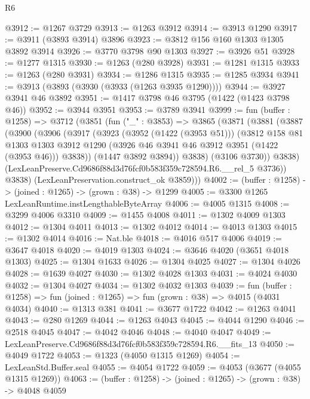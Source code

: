 \begin{lexlean}{R6}
\begin{coremodule}
@3912 := @1267 @3729
@3913 := @1263 @3912
@3914 := @3913 @1290
@3917 := @3911 (@3893 @3914) @3896
@3923 := @3812 @156 @160 @1303 @1305 @3892 @3914
@3926 := @3770 @3798 @90 @1303
@3927 := @3926 @51
@3928 := @1277 @1315
@3930 := @1263 (@280 @3928)
@3931 := @1281 @1315
@3933 := @1263 (@280 @3931)
@3934 := @1286 @1315
@3935 := @1285 @3934
@3941 := @3913 (@3893 (@3930 (@3933 (@1263 @3935 @1290))))
@3944 := @3927 @3941 @46 @3892
@3951 := @1417 @3798 @46 @3795 (@1422 (@1423 @3798 @46))
@3952 := @3944 @3951
@3953 := @3789 @3941
@3999 := fun (buffer : @1258) =>
  @3712
    (@3851
      (fun ("_" : @3853) =>
      @3865
        (@3871
          (@3881
            (@3887
              (@3900
                (@3906
                  (@3917
                    (@3923
                      (@3952 (@1422 (@3953 @51)))
                      (@3812
                        @158
                        @81
                        @1303
                        @1303
                        @3912
                        @1290
                        (@3926 @46 @3941 @46 @3912 @3951 (@1422 (@3953 @46)))
                        @3838))
                    (@1447 @3892 @3894))
                  @3838)
                (@3106 @3730))
              @3838)
            (LexLeanPreserve.Cd9686f88d3d76fcf0b583f359c728594.R6.__rel_5 @3736))
          @3838)
        (LexLeanPreservation.construct_ok @3859)))
@4002 := (buffer : @1258) -> (joined : @1265) -> (grown : @38) -> @1299
@4005 := @3300 @1265 LexLeanRuntime.instLengthableByteArray
@4006 := @4005 @1315
@4008 := @3299 @4006 @3310
@4009 := @1455 @4008
@4011 := @1302 @4009 @1303
@4012 := @1304 @4011
@4013 := @1302 @4012
@4014 := @4013 @1303
@4015 := @1302 @4014
@4016 := Nat.ble
@4018 := @4016 @517 @4006
@4019 := @3647 @4018
@4020 := @4019 @1303
@4024 := @3646 @4020 (@3651 @4018 @1303)
@4025 := @1304 @1633
@4026 := @1304 @4025
@4027 := @1304 @4026
@4028 := @1639 @4027
@4030 := @1302 @4028 @1303
@4031 := @4024 @4030
@4032 := @1304 @4027
@4034 := @1302 @4032 @1303
@4039 := fun (buffer : @1258) => fun (joined : @1265) => fun (grown : @38) => @4015 (@4031 @4034)
@4040 := @1313 @381
@4041 := @3677 @1722
@4042 := @1263 @4041
@4043 := @280 @1269
@4044 := @1263 @4043
@4045 := @4044 @1290
@4046 := @2518 @4045
@4047 := @4042 @4046
@4048 := @4040 @4047
@4049 := LexLeanPreserve.Cd9686f88d3d76fcf0b583f359c728594.R6.__fits_13
@4050 := @4049 @1722
@4053 := @1323 (@4050 @1315 @1269)
@4054 := LexLeanStd.Buffer.seal
@4055 := @4054 @1722
@4059 := @4053 (@3677 (@4055 @1315 @1269))
@4063 := (buffer : @1258) -> (joined : @1265) -> (grown : @38) -> @4048 @4059

\end{coremodule}
\end{lexlean}
